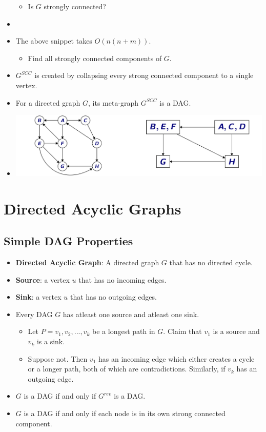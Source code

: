 \begin{itemize}
\begin{itemize}
        \item Is $G$ strongly connected?
    \end{itemize}
    \item[] 
    \item The above snippet takes $O(n(n + m))$.
    \begin{itemize}
        \item Find all strongly connected components of $G$.
    \end{itemize}
    \item $G^{SCC}$ is created by collapsing every strong connected component to a single vertex.
    \item For a directed graph $G$, its meta-graph $G^{SCC}$ is a DAG.
    \item[] \includegraphics[width=\textwidth]{lecture16/images/scc.jpg}
\end{itemize}

\section{Directed Acyclic Graphs}

\subsection{Simple DAG Properties}
\begin{itemize}
    \item \textbf{Directed Acyclic Graph}: A directed graph $G$ that has no directed cycle.
    \item \textbf{Source}: a vertex $u$ that has no incoming edges.
    \item \textbf{Sink}: a vertex $u$ that has no outgoing edges.
    \item Every DAG $G$ has atleast one source and atleast one sink.
    \begin{itemize}
        \item Let $P = v_1, v_2, ..., v_k$ be a longest path in $G$. Claim that $v_1$ is a source and $v_k$ is a sink.
        \item Suppose not. Then $v_1$ has an incoming edge which either creates a cycle or a longer path, both of which are contradictions. Similarly, if $v_k$ has an outgoing edge.
    \end{itemize}
    \item $G$ is a DAG if and only if $G^{rev}$ is a DAG.
    \item $G$ is a DAG if and only if each node is in its own strong connected component.
\end{itemize}

